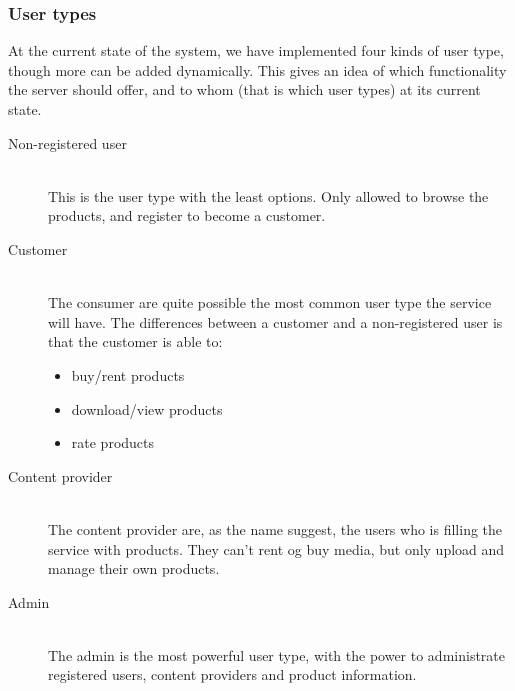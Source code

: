 \subsubsection{User types}
\label{s_actor-goal-list}
At the current state of the system, we have implemented four kinds of user type, though more can be added dynamically. This gives an idea of which functionality the server should offer, and to whom (that is which user types) at its current state.

\begin{description}
	\item [Non-registered user] \hfill \\
		This is the user type with the least options. Only allowed to browse the products, and register to become a customer.
	\item [Customer]  \hfill \\
		The consumer are quite possible the most common user type the service will have. The differences between a customer and a non-registered user is that the customer is able to:
		\begin{itemize}
			\item buy/rent products
			\item download/view products
			\item rate products
		\end{itemize}
	\item [Content provider] \hfill \\
		The content provider are, as the name suggest, the users who is filling the service with products. They can't rent og buy media, but only upload and manage their own products.
	\item [Admin] \hfill \\
		The admin is the most powerful user type, with the power to administrate registered users, content providers and product information.
\end{description}